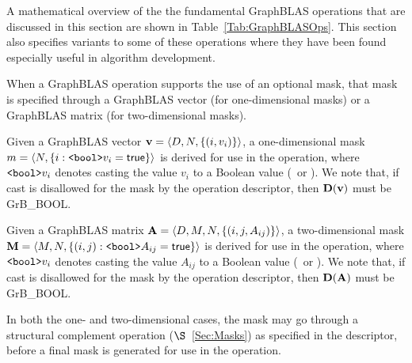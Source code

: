 \documentclass[11pt]{extarticle}
\begin{document}
A mathematical overview of the the fundamental GraphBLAS operations that are
discussed in this section are shown in Table~\ref{Tab:GraphBLASOps}.  This
section also specifies variants to some of these operations where they have
been found especially useful in algorithm development.

When a GraphBLAS operation supports the use of an optional mask, that mask is
specified through a GraphBLAS vector (for one-dimensional masks) or
a GraphBLAS matrix (for two-dimensional masks).

Given a GraphBLAS vector ${\bf v} = \langle D,N, \{ (i,v_i) \} \rangle$, a
one-dimensional mask $m = \langle N, \{ i : \mbox{\tt <bool>}v_i = {\sf true} \} \rangle$
is derived for use in the operation, where $\mbox{\tt <bool>}v_i$ denotes
casting the value $v_i$ to a Boolean value (\true\ or \false).
We note that, if cast is disallowed for the mask by the operation descriptor, then
$\bold{D}({\bf v})$ must be {\sf GrB\_BOOL}.

Given a GraphBLAS matrix ${\bf A} = \langle D, M, N, \{ (i,j,A_{ij}) \} \rangle$,
a two-dimensional mask ${\bf M} = \langle M,N, \{ (i,j) : \mbox{\tt <bool>}A_{ij} = {\sf true} \} \rangle$
is derived for use in the operation, where $\mbox{\tt <bool>}v_i$ denotes
casting the value $A_{ij}$ to a Boolean value (\true\ or \false).
We note that, if cast is disallowed for the mask by the operation descriptor, then
$\bold{D}({\bf A})$ must be {\sf GrB\_BOOL}.

In both the one- and two-dimensional cases, the mask may go through a structural
complement operation ($\S$~\ref{Sec:Masks}) as specified in the descriptor, before a final
mask is generated for use in the operation.










\appendix


%
%
\end{document}
